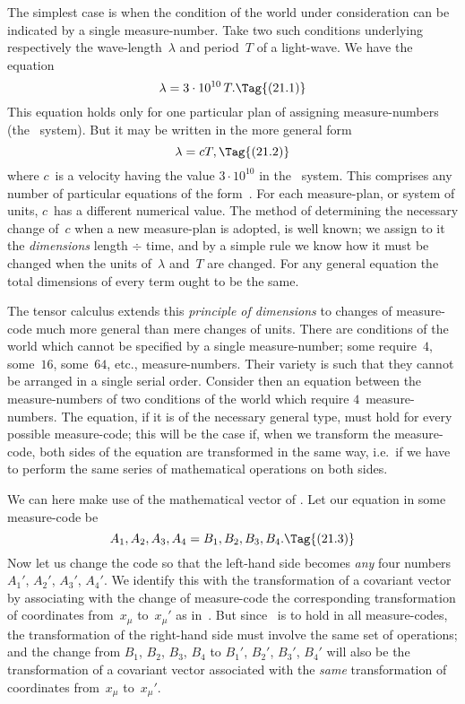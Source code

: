 \documentclass[12pt]{book}
\begin{document}
The simplest case is when the condition of the world under consideration
can be indicated by a single measure\hyp{}number. Take two such conditions
underlying respectively the wave-length~$\lambda$ and period~$T$ of a light-wave. We
have the equation
\[
\lambda = 3 \cdot 10^{10}\, T.
\Tag{(21.1)}
\]
This equation holds only for one particular plan of assigning measure\hyp{}numbers
(the \CGS\ system). But it may be written in the more general form
\[
\lambda = cT,
\Tag{(21.2)}
\]
where $c$~is a velocity having the value $3 \cdot 10^{10}$ in the \CGS\ system. This
comprises any number of particular equations of the form~. For each
measure\hyp{}plan, or system of units, $c$~has a different numerical value. The
method of determining the necessary change of~$c$ when a new measure\hyp{}plan
is adopted, is well known; we assign to it the \emph{dimensions} length $\div$ time, and
by a simple rule we know how it must be changed when the units of~$\lambda$ and~$T$
are changed. For any general equation the total dimensions of every term
ought to be the same.

The tensor calculus extends this \emph{principle of dimensions} to changes of
%
%
measure\hyp{}code much more general than mere changes of units. There are
%
%
conditions of the world which cannot be specified by a single measure\hyp{}number;
some require~$4$, some~$16$, some~$64$, etc., measure\hyp{}numbers. Their variety is
such that they cannot be arranged in a single serial order. Consider then an
equation between the measure\hyp{}numbers of two conditions of the world which
require $4$~measure\hyp{}numbers. The equation, if it is of the necessary general type,
must hold for every possible measure\hyp{}code; this will be the case if, when we
transform the measure\hyp{}code, both sides of the equation are transformed in
the same way, i.e.\ if we have to perform the same series of mathematical
operations on both sides.

We can here make use of the mathematical vector of . Let our equation
in some measure\hyp{}code be
\[
A_{1}, A_{2}, A_{3}, A_{4} = B_{1}, B_{2}, B_{3}, B_{4}.
\Tag{(21.3)}
\]
Now let us change the code so that the left\hyp{}hand side becomes \emph{any} four
numbers $A_{1}'$, $A_{2}'$, $A_{3}'$, $A_{4}'$. We identify this with the transformation of a covariant
vector by associating with the change of measure\hyp{}code the corresponding
transformation of coordinates from~$x_{\mu}$ to~$x_{\mu}'$ as in~. But since ~is
to hold in all measure\hyp{}codes, the transformation of the right-hand side must
involve the same set of operations; and the change from $B_{1}$, $B_{2}$, $B_{3}$, $B_{4}$ to $B_{1}'$,
$B_{2}'$, $B_{3}'$, $B_{4}'$ will also be the transformation of a covariant vector associated
with the \emph{same} transformation of coordinates from~$x_{\mu}$ to~$x_{\mu}'$.
\end{document}
